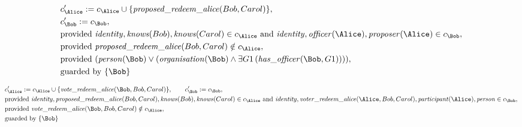 \begin{align*}
&
c'_
{
\Alice
}
 := 
c_
{
\Alice
}
 \cup 
\{
\mathit{\detokenize{
proposed_redeem_alice
}}
(
Bob
,
Carol
)
\}
,\\
&
c'_
{
\Bob
}
 := 
c_
{
\Bob
}
,\\
&
\text{provided } 
\mathit{\detokenize{
identity
}}
,
\mathit{\detokenize{
knows
}}
(
Bob
)
,
\mathit{\detokenize{
knows
}}
(
Carol
)
 \in c_
{
\Alice
}
 \text{ and } 
\mathit{\detokenize{
identity
}}
,
\mathit{\detokenize{
officer
}}
(
\Alice
)
,
\mathit{\detokenize{
proposer
}}
(
\Alice
)
 \in c_
{
\Bob
}
,\\
&
\text{provided } 
\mathit{\detokenize{
proposed_redeem_alice
}}
(
Bob
,
Carol
)
 \notin c_
{
\Alice
}
,\\
&
\text{provided } 
(
\mathit{\detokenize{
person
}}
(
\Bob
)
\lor
(
\mathit{\detokenize{
organisation
}}
(
\Bob
)
\land
\exists 
G1
\,(
\mathit{\detokenize{
has_officer
}}
(
\Bob
,
G1
)
)
)
)
,\\
&
\text{guarded by } \{
\Bob
\}
\end{align*}

\begin{align*}
&
c'_
{
\Alice
}
 := 
c_
{
\Alice
}
 \cup 
\{
\mathit{\detokenize{
vote_redeem_alice
}}
(
\Bob
,
Bob
,
Carol
)
\}
, \qquad 
c'_
{
\Bob
}
 := 
c_
{
\Bob
}
,\\
&
\text{provided } 
\mathit{\detokenize{
identity
}}
,
\mathit{\detokenize{
proposed_redeem_alice
}}
(
Bob
,
Carol
)
,
\mathit{\detokenize{
knows
}}
(
Bob
)
,
\mathit{\detokenize{
knows
}}
(
Carol
)
 \in c_
{
\Alice
}
 \text{ and } 
\mathit{\detokenize{
identity
}}
,
\mathit{\detokenize{
voter_redeem_alice
}}
(
\Alice
,
Bob
,
Carol
)
,
\mathit{\detokenize{
participant
}}
(
\Alice
)
,
\mathit{\detokenize{
person
}}
 \in c_
{
\Bob
}
,\\
&
\text{provided } 
\mathit{\detokenize{
vote_redeem_alice
}}
(
\Bob
,
Bob
,
Carol
)
 \notin c_
{
\Alice
}
,\\
&
\text{guarded by } \{
\Bob
\}
\end{align*}

